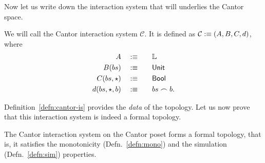 Now let us write down the interaction system that will underlies the Cantor space.
\begin{defn}\label{defn:cantor-is}
  We will call the Cantor interaction system $\mathcal{C}$. It is defined as
  $\mathcal{C} :\equiv (A, B, C, d)$, where
  \begin{alignat*}{2}
    A           \quad&:\equiv\quad && \mathbb{L}{} \\
    B(bs)       \quad&:\equiv\quad && \mathsf{Unit}{} \\
    C(bs, \star)    \quad&:\equiv\quad && \mathsf{Bool}{}   \\
    d(bs, \star, b) \quad&:\equiv\quad && bs \frown b    .
  \end{alignat*}
\end{defn}

Definition~\ref{defn:cantor-is} provides the \emph{data} of the topology. Let us now prove
that this interaction system is indeed a formal topology.
\begin{thm}\label{thm:cantor-topo}
  The Cantor interaction system on the Cantor poset forms a formal topology, that is, it
  satisfies the monotonicity (Defn.~\ref{defn:mono}) and the simulation
  (Defn.~\ref{defn:sim}) properties.
\end{thm}

